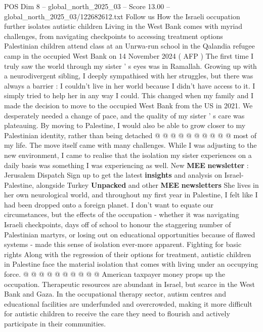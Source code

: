\begin{textsample}{POS Dim 8 – global\_north\_2025\_03 – Score 13.00 – global\_north\_2025\_03/122682612.txt}  \label{ex:f8_pos_086}
Follow us How the Israeli occupation further isolates autistic children Living in the West Bank comes with myriad challenges, from navigating checkpoints to accessing treatment options Palestinian children attend class at an Unrwa-run school in the Qalandia refugee camp in the occupied West Bank on 14 November 2024 ( AFP ) The first time I truly saw the world through my sister ' s eyes was in Ramallah.
Growing up with a neurodivergent sibling, I deeply sympathised with her struggles, but there was always a barrier : I couldn't live in her world because I didn't have access to it.
I simply tried to help her in any way I could.
This changed when my family and I made the decision to move to the occupied West Bank from the US in 2021.
We desperately needed a change of pace, and the quality of my sister ' s care was plateauing.
By moving to Palestine, I would also be able to grow closer to my Palestinian identity, rather than being detached @ @ @ @ @ @ @ @ @ @ most of my life.
The move itself came with many challenges.
While I was adjusting to the new environment, I came to realise that the isolation my sister experiences on a daily basis was something I was experiencing as well.
New \textbf{MEE} \textbf{newsletter} : Jerusalem Dispatch Sign up to get the latest \textbf{insights} and analysis on Israel-Palestine, alongside Turkey \textbf{Unpacked} and other \textbf{MEE} \textbf{newsletters} She lives in her own neurological world, and throughout my first year in Palestine, I felt like I had been dropped onto a foreign planet.
I don't want to equate our circumstances, but the effects of the occupation - whether it was navigating Israeli checkpoints, days off of school to honour the staggering number of Palestinian martyrs, or losing out on educational opportunities because of flawed systems - made this sense of isolation ever-more apparent.
Fighting for basic rights Along with the regression of their options for treatment, autistic children in Palestine face the material isolation that comes with living under an occupying force. @ @ @ @ @ @ @ @ @ @ American taxpayer money props up the occupation.
Therapeutic resources are abundant in Israel, but scarce in the West Bank and Gaza.
In the occupational therapy sector, autism centres and educational facilities are underfunded and overcrowded, making it more difficult for autistic children to receive the care they need to flourish and actively participate in their communities.

\end{textsample}
